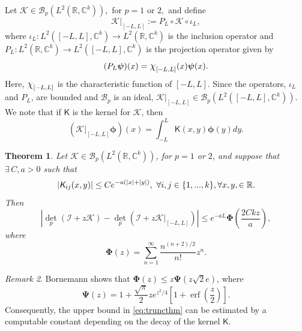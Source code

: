 \documentclass{birkjour}
\newtheorem{thm}{Theorem}[section]
\theoremstyle{definition}
\theoremstyle{remark}
\newtheorem{rem}[thm]{Remark}
\numberwithin{equation}{section}
\newcommand*{\bigchi}{\mbox{\large$\chi$}}%
\DeclareMathOperator\erf{erf}
\newcommand{\cB}{{\mathcal B}}
\begin{document}
    Let  $\mathcal{K} \in \cB_p(L^2(\mathbb{R},\mathbb{C}^k)),$ for $p=1$ or $2,$ and define 
    \begin{equation}
        \mathcal{K}|_{[-L,L]} := P_L \circ \mathcal{K} \circ \iota_{L},
    \end{equation}
    where $\iota_L : L^2([-L,L],\mathbb{C}^k) \rightarrow L^2(\mathbb{R},\mathbb{C}^k)$ is the inclusion operator and $P_L : L^2(\mathbb{R},\mathbb{C}^k) \rightarrow L^2([-L,L],\mathbb{C}^k)$ is the  projection operator given by
    \begin{equation}
        (P_L \boldsymbol{\psi})(x) = \bigchi_{[-L,L]}(x) \boldsymbol{\psi}(x).
    \end{equation}
    Here, $\bigchi_{[-L,L]}$ is the characteristic function of $[-L,L]$. Since 
    the operators, $\iota_L$ and $P_L$, are bounded and 
    $\cB_p$ is an ideal, $\mathcal{K}|_{[-L,L]} \in \cB_p(L^2([-L, L],\mathbb{C}^k)).$ 
 We note that if $\textsf{K}$ is the kernel for $\mathcal K$, then
\begin{equation}\label{QM1a}
    (\mathcal{K}|_{[-L,L]}\boldsymbol{\phi})(x) = \int_{-L}^L \textsf{K}(x,y)\boldsymbol{\phi}(y) dy.
\end{equation}

\begin{thm}\label{truncthm}
Let $\mathcal{K} \in \cB_p(L^2(\mathbb{R},\mathbb{C}^k))$, for $p=1$ or $2$, and suppose
that $\exists \, C, a > 0$ such that
\begin{equation}\label{truncexpass}
    |\emph{\textsf{K}}_{ij}(x,y)| \leq Ce^{-a(|x| + |y|)}, \,\, \forall i,j \in \{1,...,k\}, \forall x, y, \in \mathbb{R}.
\end{equation}
Then 
\begin{equation}\label{eq:truncthm}
    \left| {\det}_p(\mathcal{I} + z \mathcal{K}) - {\det}_p (\mathcal{I} + z \mathcal{K}|_{[-L,L]})\right| \leq e^{-aL} \boldsymbol{\Phi} \left( \frac{2Ckz}{a} \right),
\end{equation}
where 
\begin{equation}\label{phisum}
    \boldsymbol{\Phi}(z) = \sum_{n=1}^{\infty} \frac{n^{(n+2)/2}}{n!} z^n.
\end{equation}
\end{thm}

\begin{rem}
Bornemann \cite{Bornemann} shows that
$\boldsymbol{\Phi}(z) \leq z \boldsymbol{\Psi}(z\sqrt{2} e)$,
where
\begin{equation}
    \boldsymbol{\Psi}(z) = 1 + \frac{\sqrt{\pi}}{2}z e^{z^2/4} \left[1 + \erf\left(\frac{z}{2}\right) \right].
\end{equation}
Consequently, the upper bound in \eqref{eq:truncthm} can be estimated by a 
computable constant depending on the decay of the kernel $\textsf{K}.$
\end{rem}
\end{document}
